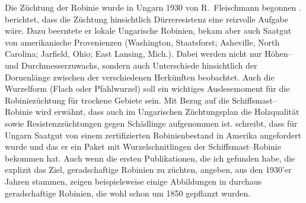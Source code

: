 \documentclass[twocolumn]{scrartcl}
\begin{document}
Die Züchtung der Robinie wurde in Ungarn 1930 von R.~Fleischmann
begonnen \citep{keresztesi1983robinie}. \cite{fleischmann1933robinie}
berichtet, dass die Züchtung hinsichtlich Dürreresistenz eine
reizvolle Aufgabe wäre. Dazu beerntete er lokale Ungarische Robinien,
bekam aber auch Saatgut von amerikanische Provenienzen (Washington,
Staatsforst; Asheville, North Carolina; Jarfield, Ohio; East Lansing,
Mich.).%
Dabei werden nicht nur Höhen-- und Durchmesserzuwachs, sondern auch
Unterschiede hinsichtlich der Dornenlänge zwischen der verschiedenen
Herkünften beobachtet.
Auch die Wurzelform (Flach oder Pfahlwurzel) soll ein wichtiges
Auslesemoment für die Robiniezüchtung für trockene Gebiete sein. Mit
Bezug auf die Schiffsmast--Robinie \citep{raber1936shipmast} wird
erwähnt, dass auch im Ungarischen Züchtungsplan die Holzqualität sowie
Resistenzzüchtungen gegen Schädlinge aufgenommen
ist. \cite{mihalyi1937robinie} schreibt, dass für Ungarn Saatgut von
einem zertifizierten Robinienbestand in Amerika angefordert wurde und
das er ein Paket mit Wurzelschnitlingen der Schiffsmast--Robinie
bekommen hat. Auch wenn die ersten Publikationen, die ich gefunden
habe, die explizit das Ziel, geradschaftige Robinien zu züchten, angeben,
aus den 1930'er Jahren stammen, zeigen beispielsweise
einige Abbildungen in \cite{vadas1911robinie} durchaus geradschaftige
Robinien, die wohl schon um 1850 gepflanzt wurden.
\end{document}
